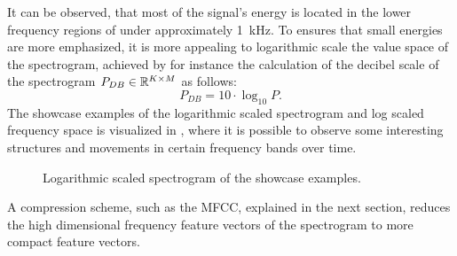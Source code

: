 \FloatBarrier
\noindent
It can be observed, that most of the signal's energy is located in the lower frequency regions of under approximately \SI{1}{\kilo\hertz}.
To ensures that small energies are more emphasized, it is more appealing to logarithmic scale the value space of the spectrogram, achieved by for instance the calculation of the decibel scale of the spectrogram $P_{DB} \in \mathbb{R}^{K \times M}$ as follows:
\begin{equation}\label{eq:signal_spec_log}
  P_{DB} = 10 \cdot \log_{10}{P}.
\end{equation}
The showcase examples of the logarithmic scaled spectrogram and log scaled frequency space is visualized in , where it is possible to observe some interesting structures and movements in certain frequency bands over time.
\begin{figure}[!ht]
  \centering
  \caption{Logarithmic scaled spectrogram of the showcase examples.}
  \label{fig:signal_spec_log_showcase}
\end{figure}
\FloatBarrier
\noindent
A compression scheme, such as the MFCC, explained in the next section, reduces the high dimensional frequency feature vectors of the spectrogram to more compact feature vectors.